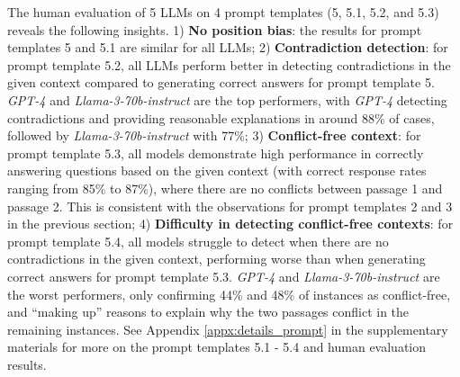 The human evaluation of 5 LLMs on 4 prompt templates (5, 5.1, 5.2, and 5.3) reveals the following insights. 
1) \textbf{No position bias}: the results for prompt templates 5 and 5.1 are similar for all LLMs;
2) \textbf{Contradiction detection}: for prompt template 5.2, all LLMs perform better in detecting contradictions in the given context compared to generating correct answers for prompt template 5. \emph{GPT-4} and \emph{Llama-3-70b-instruct} are the top performers, with \emph{GPT-4} detecting contradictions and providing reasonable explanations in around 88\% of cases, followed by \emph{Llama-3-70b-instruct} with 77\%;
3) \textbf{Conflict-free context}: for prompt template 5.3, all models demonstrate high performance in correctly answering questions based on the given context (with correct response rates ranging from 85\% to 87\%), where there are no conflicts between passage 1 and passage 2. This is consistent with the observations for prompt templates 2 and 3 in the previous section;
4) \textbf{Difficulty in detecting conflict-free contexts}: for prompt template 5.4, all models struggle to detect when there are no contradictions in the given context, performing worse than when generating correct answers for prompt template 5.3. \emph{GPT-4} and \emph{Llama-3-70b-instruct} are the worst performers, only confirming 44\% and 48\% of instances as conflict-free, and ``making up'' reasons to explain why the two passages conflict in the remaining instances. See Appendix \ref{appx:details_prompt} in the supplementary materials for more on the prompt templates 5.1 - 5.4 and human evaluation results.





